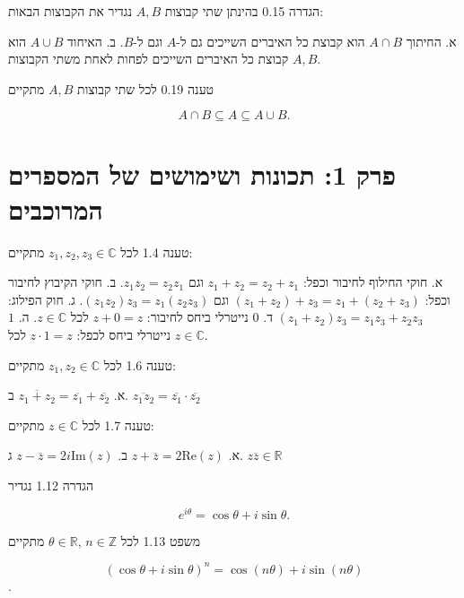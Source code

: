 \documentclass[a4paper, 11pt]{article}
\begin{document}
\begin{envbox}[defcolor]{הגדרה 0.15}
בהינתן שתי קבוצות $A,B$ נגדיר את הקבוצות הבאות:

א. החיתוך $A\cap B$ הוא קבוצת כל האיברים השייכים גם ל-$A$ וגם ל-$B$.
ב. האיחוד $A\cup B$ הוא קבוצת כל האיברים השייכים לפחות לאחת משתי הקבוצות $A,B$.
\end{envbox}

\begin{envbox}[thmcolor]{טענה 0.19}
לכל שתי קבוצות $A,B$ מתקיים

\[
A\cap B\subseteq A\subseteq A\cup B.
\]
\end{envbox}

\newpage

\section{פרק 1: תכונות ושימושים של המספרים המרוכבים}

\begin{envbox}[thmcolor]{טענה 1.4}
לכל $z_{1},z_{2},z_{3}\in\mathbb{C}$ מתקיים:

א. חוקי החילוף לחיבור וכפל: $z_{1}+z_{2}=z_{2}+z_{1}$ וגם $z_{1}z_{2}=z_{2}z_{1}$.
ב. חוקי הקיבוץ לחיבור וכפל: $(z_{1}+z_{2})+z_{3}=z_{1}+(z_{2}+z_{3})$ וגם $(z_{1}z_{2})z_{3}=z_{1}(z_{2}z_{3})$.
ג. חוק הפילוג: $(z_{1}+z_{2})z_{3}=z_{1}z_{3}+z_{2}z_{3}$
ד. $0$ נייטרלי ביחס לחיבור: $z+0=z$ לכל $z\in\mathbb{C}$.
ה. $1$ נייטרלי ביחס לכפל: $z\cdot1=z$ לכל $z\in\mathbb{C}$.
\end{envbox}

\begin{envbox}[thmcolor]{טענה 1.6}
לכל $z_{1},z_{2}\in\mathbb{C}$ מתקיים:

א. $\overline{z_{1}+z_{2}}=\overline{z_{1}}+\overline{z_{2}}$
ב. $\overline{z_{1}z_{2}}=\overline{z_{1}}\cdot\overline{z_{2}}$
\end{envbox}

\begin{envbox}[thmcolor]{טענה 1.7}
לכל $z\in\mathbb{C}$ מתקיים:

א. $z+\overline{z}=2\text{Re}(z)$
ב. $z-\overline{z}=2i\text{Im}(z)$
ג. $z\overline{z}\in\mathbb{R}$
\end{envbox}

\begin{envbox}[defcolor]{הגדרה 1.12}
נגדיר

\[
e^{i\theta}=\cos\theta+i\sin\theta.
\]
\end{envbox}

\begin{envbox}[thmcolor]{משפט 1.13}
לכל $\theta\in\mathbb{R},\,n\in\mathbb{Z}$ מתקיים

\[
(\cos\theta+i\sin\theta)^{n}=\cos(n\theta)+i\sin(n\theta)
\]
.
\end{envbox}
\end{document}
